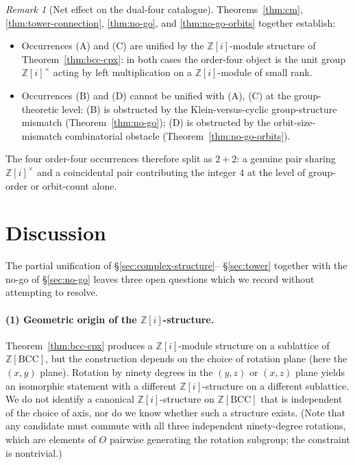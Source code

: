 \documentclass[11pt,reqno]{amsart}
\theoremstyle{plain}
\theoremstyle{definition}
\theoremstyle{remark}
\newtheorem{remark}[theorem]{Remark}
\numberwithin{equation}{section}
\newcommand{\BCC}{\mathrm{BCC}}
\begin{document}
\begin{remark}[Net effect on the dual-four catalogue]
\label{rem:catalogue-net}
Theorems~\ref{thm:cm}, \ref{thm:tower-connection}, \ref{thm:no-go},
and \ref{thm:no-go-orbits} together establish:
\begin{itemize}[leftmargin=*]
\item Occurrences (A) and (C) are unified by the
$\mathbb{Z}[i]$-module structure of Theorem~\ref{thm:bcc-cpx}: in
both cases the order-four object is the unit group $\mathbb{Z}[i]
^{\times}$ acting by left multiplication on a $\mathbb{Z}[i]$-module
of small rank.
\item Occurrences (B) and (D) cannot be unified with (A), (C) at the
group-theoretic level: (B) is obstructed by the Klein-versus-cyclic
group-structure mismatch (Theorem~\ref{thm:no-go}); (D) is
obstructed by the orbit-size-mismatch combinatorial obstacle
(Theorem~\ref{thm:no-go-orbits}).
\end{itemize}
The four order-four occurrences therefore split as $2 + 2$: a
genuine pair sharing $\mathbb{Z}[i]^{\times}$ and a coincidental
pair contributing the integer $4$ at the level of group-order or
orbit-count alone.
\end{remark}

\section{Discussion}
\label{sec:discussion}

The partial unification of \S\ref{sec:complex-structure}--%
\S\ref{sec:tower} together with the no-go of \S\ref{sec:no-go}
leaves three open questions which we record without attempting to
resolve.

\paragraph{(1) Geometric origin of the $\mathbb{Z}[i]$-structure.}
Theorem~\ref{thm:bcc-cpx} produces a $\mathbb{Z}[i]$-module
structure on a sublattice of $\mathbb{Z}[\BCC]$, but the
construction depends on the choice of rotation plane (here the
$(x, y)$ plane). Rotation by ninety degrees in the $(y, z)$ or
$(x, z)$ plane yields an isomorphic statement with a different
$\mathbb{Z}[i]$-structure on a different sublattice. We do not
identify a canonical $\mathbb{Z}[i]$-structure on $\mathbb{Z}[\BCC]$
that is independent of the choice of axis, nor do we know whether
such a structure exists. (Note that any candidate must commute
with all three independent ninety-degree rotations, which are
elements of $O$ pairwise generating the rotation subgroup; the
constraint is nontrivial.)
\end{document}
